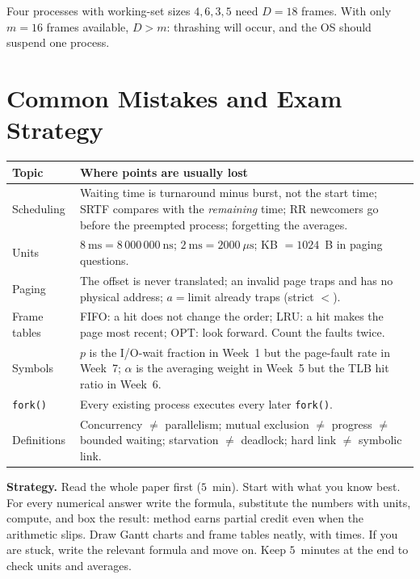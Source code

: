 \documentclass[11pt,a4paper]{article}
\newcommand{\cmd}[1]{\texttt{#1}}
\begin{document}
\begin{example}
Four processes with working-set sizes $4, 6, 3, 5$ need $D = 18$ frames. With only $m = 16$ frames available, $D > m$: thrashing will occur, and the OS should suspend one process.
\end{example}

\section{Common Mistakes and Exam Strategy}
\label{sec:mistakes}
\begin{center}
\renewcommand{\arraystretch}{1.25}
\begin{tabularx}{\linewidth}{@{}>{\raggedright\arraybackslash}p{3.0cm} X@{}}
\toprule
\textbf{Topic} & \textbf{Where points are usually lost} \\
\midrule
Scheduling & Waiting time is turnaround minus burst, not the start time; SRTF compares with the \emph{remaining} time; RR newcomers go before the preempted process; forgetting the averages. \\
Units & $8\ \text{ms} = 8\,000\,000\ \text{ns}$; $2\ \text{ms} = 2000\ \mu\text{s}$; KB $= 1024$~B in paging questions. \\
Paging & The offset is never translated; an invalid page traps and has no physical address; $a = \text{limit}$ already traps (strict $<$). \\
Frame tables & FIFO: a hit does not change the order; LRU: a hit makes the page most recent; OPT: look forward. Count the faults twice. \\
Symbols & $p$ is the I/O-wait fraction in Week~1 but the page-fault rate in Week~7; $\alpha$ is the averaging weight in Week~5 but the TLB hit ratio in Week~6. \\
\cmd{fork()} & Every existing process executes every later \cmd{fork()}. \\
Definitions & Concurrency $\ne$ parallelism; mutual exclusion $\ne$ progress $\ne$ bounded waiting; starvation $\ne$ deadlock; hard link $\ne$ symbolic link. \\
\bottomrule
\end{tabularx}
\end{center}
\textbf{Strategy.} Read the whole paper first ($5$~min). Start with what you know best. For every numerical answer write the formula, substitute the numbers with units, compute, and box the result: method earns partial credit even when the arithmetic slips. Draw Gantt charts and frame tables neatly, with times. If you are stuck, write the relevant formula and move on. Keep $5$~minutes at the end to check units and averages.
\end{document}
